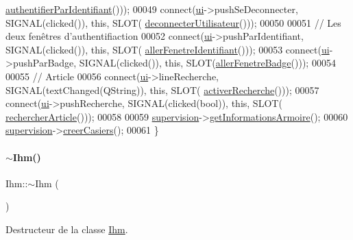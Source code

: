 \begin{DoxyCode}
      \hyperlink{class_ihm_afac914d96f4070dd7fd9e53d4b5989c1}{authentifierParIdentifiant}()));
00049     connect(\hyperlink{class_ihm_a0ac5f47856566ceeeca1720109bf70ea}{ui}->pushSeDeconnecter, SIGNAL(clicked()), \textcolor{keyword}{this}, SLOT(
      \hyperlink{class_ihm_a4c4b8c870f639fba192a3c6eff52883d}{deconnecterUtilisateur}()));
00050 
00051     \textcolor{comment}{// Les deux fenêtres d'authentifiaction}
00052     connect(\hyperlink{class_ihm_a0ac5f47856566ceeeca1720109bf70ea}{ui}->pushParIdentifiant, SIGNAL(clicked()), \textcolor{keyword}{this}, SLOT(
      \hyperlink{class_ihm_ac464b57ceab0451e8bbc56e40c1bb3a9}{allerFenetreIdentifiant}()));
00053     connect(\hyperlink{class_ihm_a0ac5f47856566ceeeca1720109bf70ea}{ui}->pushParBadge, SIGNAL(clicked()), \textcolor{keyword}{this}, SLOT(\hyperlink{class_ihm_a08d82e976e48a2f8fced132a4ba22049}{allerFenetreBadge}()));
00054 
00055     \textcolor{comment}{// Article}
00056     connect(\hyperlink{class_ihm_a0ac5f47856566ceeeca1720109bf70ea}{ui}->lineRecherche, SIGNAL(textChanged(QString)), \textcolor{keyword}{this}, SLOT(
      \hyperlink{class_ihm_a3ef457d0b75d54ab131d97f7461daab6}{activerRecherche}()));
00057     connect(\hyperlink{class_ihm_a0ac5f47856566ceeeca1720109bf70ea}{ui}->pushRecherche, SIGNAL(clicked(\textcolor{keywordtype}{bool})), \textcolor{keyword}{this}, SLOT(
      \hyperlink{class_ihm_a03b67c17f7bd3b8b2ef8d095f460a6b9}{rechercherArticle}()));
00058 
00059     \hyperlink{class_ihm_a454ab89ced1b27fcb42d550e443e780c}{supervision}->\hyperlink{class_supervision_a72bd93799fcf5423a5f0c5538d4ec892}{getInformationsArmoire}();
00060     \hyperlink{class_ihm_a454ab89ced1b27fcb42d550e443e780c}{supervision}->\hyperlink{class_supervision_a558665fd7e7c44653907883afd9a58bf}{creerCasiers}();
00061 \}
\end{DoxyCode}
\mbox{\label{class_ihm_add292ea9005bacd1de44dd1ed9ede5b9}} 
\paragraph{\texorpdfstring{$\sim$\+Ihm()}{~Ihm()}}
{\footnotesize\ttfamily Ihm\+::$\sim$\+Ihm (\begin{DoxyParamCaption}{ }\end{DoxyParamCaption})}



Destructeur de la classe \hyperlink{class_ihm}{Ihm}. 

